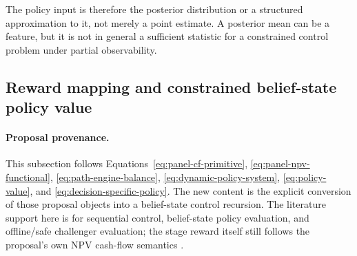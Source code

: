 \documentclass[11pt]{article}
\newcommand{\1}{\mathbf{1}}
\begin{document}
The policy input is therefore the posterior distribution or a structured
approximation to it, not merely a point estimate. A posterior mean can be a
feature, but it is not in general a sufficient statistic for a constrained
control problem under partial observability.

\subsection{Reward mapping and constrained belief-state policy value}
\label{subsec:state-space-reward-bellman}

\paragraph{Proposal provenance.}
This subsection follows Equations~\eqref{eq:panel-cf-primitive},
\eqref{eq:panel-npv-functional}, \eqref{eq:path-engine-balance},
\eqref{eq:dynamic-policy-system}, \eqref{eq:policy-value}, and
\eqref{eq:decision-specific-policy}. The new content is the explicit conversion
of those proposal objects into a belief-state control recursion. The literature
support here is for sequential control, belief-state policy evaluation, and
offline/safe challenger evaluation; the stage reward itself still follows the
proposal's own NPV cash-flow semantics
\citep{puterman1994mdp,murphy2003dynamic,smallwood1973pomdp,
kaelbling1998pomdp,jiangli2016dr,huwager2021pomdpope,laroche2019spibb,
khraishiokhrati2022offlinecredit}.
\end{document}
